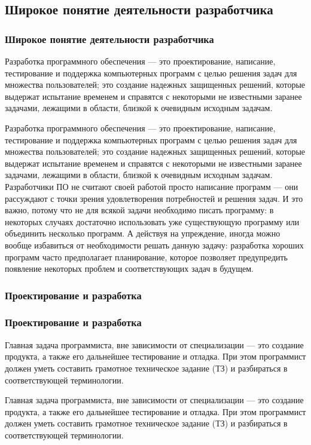 \documentclass{../industrial-development}
\begin{document}
\subsection{Широкое понятие деятельности разработчика}
\begin{frame} \frametitle{Широкое понятие деятельности разработчика}
Разработка программного обеспечения --- это проектирование, написание, тестирование и поддержка компьютерных программ с целью решения задач для множества пользователей; это создание надежных защищенных решений, которые выдержат испытание временем и справятся с некоторыми не известными заранее задачами, лежащими в области, близкой к очевидным исходным задачам.
\end{frame}
\lecturenotes
Разработка программного обеспечения --- это проектирование, написание, тестирование и поддержка компьютерных программ с целью решения задач для множества пользователей; это создание надежных защищенных решений, которые выдержат испытание временем и справятся с некоторыми не известными заранее задачами, лежащими в области, близкой к очевидным исходным задачам.\\
Разработчики ПО не считают своей работой просто написание программ --- они рассуждают с точки зрения удовлетворения потребностей и решения задач. И это важно, потому что не для всякой задачи необходимо писать программу: в некоторых случаях достаточно использовать уже существующую программу или объединить несколько программ. А действуя на упреждение, иногда можно вообще избавиться от необходимости решать данную задачу: разработка хороших программ часто предполагает планирование, которое позволяет предупредить появление некоторых проблем и соответствующих задач в будущем.

\subsubsection{Проектирование и разработка}
\begin{frame} \frametitle{Проектирование и разработка}
Главная задача программиста, вне зависимости от специализации — это создание продукта, а также его дальнейшее тестирование и отладка. При этом программист должен уметь составить грамотное техническое задание (ТЗ) и разбираться в соответствующей терминологии.
\end{frame}
\lecturenotes
Главная задача программиста, вне зависимости от специализации — это создание продукта, а также его дальнейшее тестирование и отладка. При этом программист должен уметь составить грамотное техническое задание (ТЗ) и разбираться в соответствующей терминологии.
\end{document}
